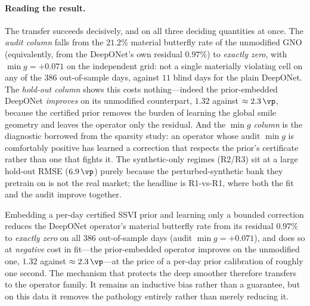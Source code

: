\paragraph{Reading the result.} The transfer succeeds decisively, and on all three deciding
quantities at once. The \emph{audit column} falls from the $21.2\%$ material butterfly rate of
the unmodified GNO (equivalently, from the DeepONet's own residual $0.97\%$) to \emph{exactly
zero}, with $\min g=+0.071$ on the independent grid: not a single materially violating cell on
any of the $386$ out-of-sample days, against $11$ blind days for the plain DeepONet. The
\emph{hold-out column} shows this costs nothing---indeed the prior-embedded DeepONet
\emph{improves} on its unmodified counterpart, $1.32$ against $\approx2.3\,\vp$, because the
certified prior removes the burden of learning the global smile geometry and leaves the operator
only the residual. And the \emph{$\min g$ column} is the diagnostic borrowed from the sparsity
study: an operator whose audit $\min g$ is comfortably positive has learned a correction that
respects the prior's certificate rather than one that fights it. The synthetic-only regimes
(R2/R3) sit at a large hold-out RMSE ($6.9\,\vp$) purely because the perturbed-synthetic bank
they pretrain on is not the real market; the headline is R1-vs-R1, where both the fit and the
audit improve together.

\begin{finding}
\label{find:prioroperator}
Embedding a per-day certified SSVI prior and learning only a bounded correction reduces the
DeepONet operator's material butterfly rate from its residual $0.97\%$ to \emph{exactly zero}
on all $386$ out-of-sample days (audit $\min g=+0.071$), and does so at \emph{negative} cost in
fit---the prior-embedded operator improves on the unmodified one, $1.32$ against
$\approx2.3\,\vp$---at the price of a per-day prior calibration of roughly one second. The
mechanism that protects the deep smoother therefore transfers to the operator family. It remains
an inductive bias rather than a guarantee, but on this data it removes the pathology entirely
rather than merely reducing it.
\end{finding}